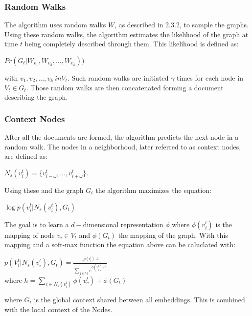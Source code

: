 \documentclass[sigconf]{acmart}
\begin{document}
\subsubsection{Random Walks}
The algorithm uses random walks \(W\), as described in 2.3.2, to sample the graphs. Using these random walks, the algorithm estimates the likelihood of the graph
at time \(t\) being completely described through them. This likelihood is defined as:
\begin{center}
  \(Pr(G_t|W_{v_1}, W_{v_2},\ldots, W_{v_k}))\)
\end{center}
with \(v_1, v_2, \ldots, v_k \ in V_t\).
Such random walks are initiated \(\gamma\) times for each node in \(V_t \in G_t\).
Those random walks are then concatenated forming a document describing the graph.
\subsubsection{Context Nodes}
After all the documents are formed, the algorithm predicts the next node in a random walk. 
The nodes in a neighborhood, later referred to as context nodes, are defined as: 
\begin{center}
  \(N_s(v_i^t)=\{v_{i-\omega}^t, \ldots, v_{i+\omega}^t\}\).
\end{center}
Using these and the graph \(G_t\) the algorithm maximizes the equation: 
\begin{center}
  \(\log{p(v_i^t | N_s(v_i^t), G_t)}\)
\end{center}
The goal is to learn a \(d-\)dimensional representation \(\phi\) where \(\phi(v_i^t)\) is the mapping of node
\(v_i \in V_t\) and \(\phi(G_t)\) the mapping of the graph. With this mapping and a soft-max function the equation above can be caluclated with: 
\begin{center}
  \(p(V_i^t|N_s(v_i^t), G_t) = \frac{e^{\phi(v_i^t) \cdot h}}{\sum\limits_{j \in V_t} e^{\phi(v_j^t) \cdot h}}   \)\\
  where \(h=\sum\limits_{c \in N_s(v_i^t)} \phi(v_c^t) + \phi(G_t)\)
\end{center}
where \(G_t\) is the global context shared between all embeddings. This is combined with the local context of the Nodes.
\end{document}
